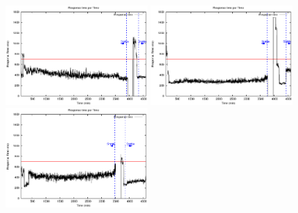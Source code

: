 


\setcounter{figure}{6}

\begin{figure}[htb]
	\begin{minipage}[b]{0.20\linewidth}
		\vspace{-3mm}
		\includegraphics[width=\linewidth,height=3.8cm]{images/exps2011/low/das/proxyDataPoints_output.eps}	
	\end{minipage}
\begin{minipage}[b]{0.20\linewidth}
		\vspace{-3mm}
		\includegraphics[width=\linewidth,height=3.8cm]{images/exps2011/medium_down/das/proxyDataPoints_output.eps}
	\end{minipage}
	\begin{minipage}[b]{0.19\linewidth}
		\vspace{-3mm}
		\includegraphics[width=\linewidth,height=3.8cm]{images/exps2011/medium/das/proxyDataPoints_output.eps}

\end{minipage}
\end{figure}
